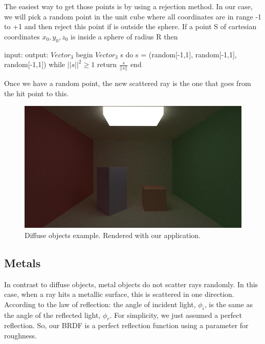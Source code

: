\documentclass[titlepage,12pt]{report}
\begin{document}
The easiest way to get those points is by using a rejection method. In our case, we will pick a random point in the unit cube where all coordinates are in range -1 to +1 and then reject this point if is outside the sphere. If a point S of cartesian coordinates $x_0, y_0, z_0$ is inside a sphere of radius R then 

\begin{algorithm}[caption={random\_on\_unit\_sphere}]
input: 
output: $Vector_3$
begin
  $Vector_3$ s
  do
    s = (random[-1,1], random[-1,1], random[-1,1])
  while $||s||^2 \geq 1$
  return $\frac{s}{||s||}$
end
\end{algorithm}

Once we have a random point, the new scattered ray is the one that goes from the hit point to this.

\begin{figure}[H]
	\centering
	\includegraphics[scale=0.65]{media/cornell_normal_test.png}
	\caption{Diffuse objects example. Rendered with our application.}
	\label{diff3}
\end{figure}

\subsection{Metals}

In contrast to diffuse objects, metal objects do not scatter rays randomly. In this case, when a ray hits a metallic surface, this is scattered in one direction. According to the law of reflection: the angle of incident light, $\phi_i$, is the same as the angle of the reflected light, $\phi_r$. For simplicity, we just assumed a perfect reflection. So, our BRDF is a perfect reflection function using a parameter for roughness.
\end{document}
